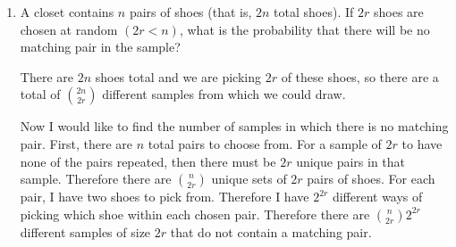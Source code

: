 \documentclass[10pt,twoside]{article}
\begin{document}
\begin{enumerate}
    
    \item A closet contains $n$ pairs of shoes (that is, $2n$ total shoes). If $2r$ shoes are chosen at random $(2r < n)$, what is the probability that there will be no matching pair in the sample? 
    
    {\color{blue} There are $2n$ shoes total and we are picking $2r$ of these shoes, so there are a total of $\binom{2n}{2r}$ different samples from which we could draw. 
    
    Now I would like to find the number of samples in which there is no matching pair. First, there are $n$ total pairs to choose from. For a sample of $2r$ to have none of the pairs repeated, then there must be $2r$ unique pairs in that sample. Therefore there are $\binom{n}{2r}$ unique sets of $2r$ pairs of shoes. For each pair, I have two shoes to pick from. Therefore I have $2^{2r}$ different ways of picking which shoe within each chosen pair. Therefore there are $\binom{n}{2r}2^{2r}$ different samples of size $2r$ that do not contain a matching pair.
    
}
\end{enumerate}
\end{document}
